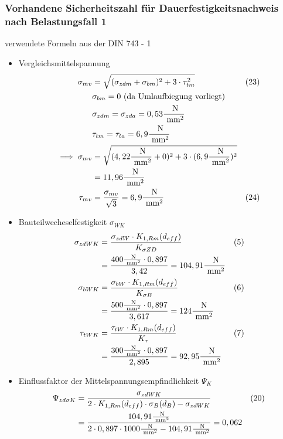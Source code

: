 \subsubsection{Vorhandene Sicherheitszahl für Dauerfestigkeitsnachweis nach Belastungsfall 1 }
verwendete Formeln aus der DIN 743 - 1
\begin{itemize}
	\item Vergleichsmittelspannung 
	\begin{align*}
	\sigma_{mv}&= \sqrt{(\sigma_{zdm} +\sigma_{bm} )^2+ 3 \cdot \tau_{tm}^2 } & (23) \\
	&\sigma_{bm}= 0 \text{ (da Umlaufbiegung vorliegt)} \\
	&\sigma_{zdm} = \sigma_{zda} = 0,53\frac{\text{ N}}{\text{ mm}^2} \\
	&\tau_{tm} = \tau_{ta} = 6,9 \frac{\text{ N}}{\text{ mm}^2} \\
	\implies \sigma_{mv}&= \sqrt{(4,22 \frac{\text{ N}}{\text{ mm}^2} +0 )^2+ 3 \cdot (6,9 \frac{\text{ N}}{\text{ mm}^2})^2 }  \\
	&= 11,96 \frac{\text{ N}}{\text{ mm}^2} \\
	\tau_{mv} &= \frac{\sigma_{mv}}{\sqrt{3}} = 6,9 \frac{\text{ N}}{\text{ mm}^2} & (24)
	\end{align*}
	\item Bauteilwecheselfestigkeit $\sigma_{WK}$ 
	\begin{align*}
	\sigma_{zdWK}&= \frac{\sigma_{zdW} \cdot K_{1,Rm} (d_{eff})}{K_{\sigma ZD}}  & (5)\\
	&=  \frac{400 \frac{\text{ N}}{\text{ mm}^2}\cdot 0,897}{3,42} = 104,91 \frac{\text{ N}}{\text{ mm}^2}\\
	\sigma_{bWK}&= \frac{\sigma_{bW} \cdot K_{1,Rm} (d_{eff})}{K_{\sigma B}}  & (6 )\\
	&=  \frac{500 \frac{\text{ N}}{\text{ mm}^2}\cdot 0,897}{3,617} = 124 \frac{\text{ N}}{\text{ mm}^2}\\
	\tau_{tWK}&= \frac{\tau_{tW} \cdot K_{1,Rm} (d_{eff})}{K_{\tau}} &(7) \\
	&=  \frac{300 \frac{\text{ N}}{\text{ mm}^2}\cdot 0,897}{2,895} = 92,95 \frac{\text{ N}}{\text{ mm}^2}
	\end{align*}
	\item Einflussfaktor der Mittelspannungsempfindlichkeit $\Psi_{K}$ 
	\begin{align*}
	\Psi_{zd \sigma K}&= \frac{\sigma_{zdWK}}{2 \x  K_{1,Rm} (d_{eff}) \x \sigma_B (d_B) -\sigma_{zdWK}}  &(20)\\
	&=  \frac{104,91 \frac{\text{ N}}{\text{ mm}^2}}{2 \x 0,897 \x 1000\frac{\text{ N}}{\text{ mm}^2} - 104,91 \frac{\text{ N}}{\text{ mm}^2}} = 0,062 \\

\end{align*}
\end{itemize}
